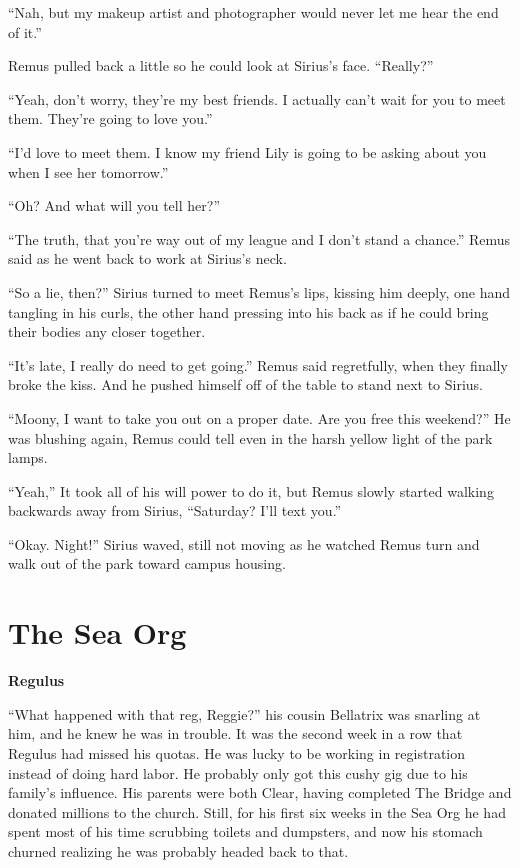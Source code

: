 \documentclass[12pt,twoside,openright]{memoir}
\begin{document}
``Nah, but my makeup artist and photographer would never let me hear the end of it.''

Remus pulled back a little so he could look at Sirius's face. ``Really?''

``Yeah, don't worry, they're my best friends. I actually can't wait for you to meet them. They're going to love you.''

``I'd love to meet them. I know my friend Lily is going to be asking about you when I see her tomorrow.''

``Oh? And what will you tell her?''

``The truth, that you're way out of my league and I don't stand a chance.'' Remus said as he went back to work at Sirius's neck.

``So a lie, then?'' Sirius turned to meet Remus's lips, kissing him deeply, one hand tangling in his curls, the other hand pressing into his back as if he could bring their bodies any closer together.

``It's late, I really do need to get going.'' Remus said regretfully, when they finally broke the kiss. And he pushed himself off of the table to stand next to Sirius.

``Moony, I want to take you out on a proper date. Are you free this weekend?'' He was blushing again, Remus could tell even in the harsh yellow light of the park lamps.

``Yeah,'' It took all of his will power to do it, but Remus slowly started walking backwards away from Sirius, ``Saturday?
I'll text you.''

``Okay. Night!'' Sirius waved, still not moving as he watched Remus turn and walk out of the park toward campus housing.

\chapter{The Sea Org}

\textbf{Regulus} 

``What happened with that reg, Reggie?'' his cousin Bellatrix was snarling at him, and he knew he was in trouble. It was the second week in a row that Regulus had missed his quotas. He was lucky to be working in registration instead of doing hard labor. He probably only got this cushy gig due to his family's influence. His parents were both Clear, having completed The Bridge and donated millions to the church. Still, for his first six weeks in the Sea Org he had spent most of his time scrubbing toilets and dumpsters, and now his stomach churned realizing he was probably headed back to that.
\end{document}
